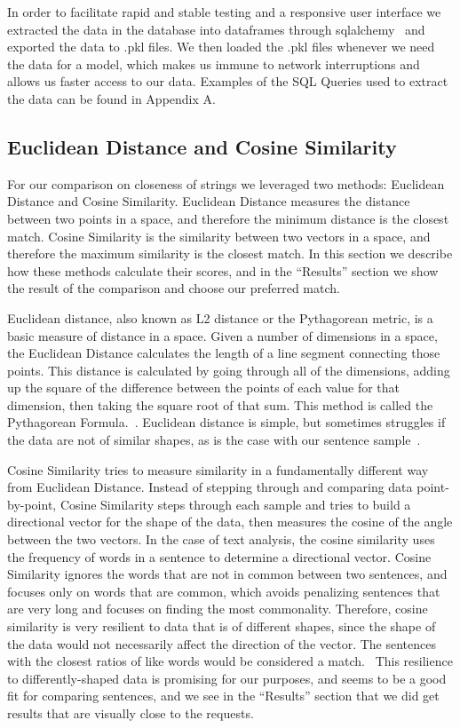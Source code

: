 \documentclass[runningheads]{llncs}
\begin{document}
	In order to facilitate rapid and stable testing and a responsive user interface we extracted the data in the database into dataframes through sqlalchemy~\cite{ref_url15} and exported the data to .pkl files. We then loaded the .pkl files whenever we need the data for a model, which makes us immune to network interruptions and allows us faster access to our data. Examples of the SQL Queries used to extract the data can be found in Appendix A.
	

	\subsection{Euclidean Distance and Cosine Similarity}	
	For our comparison on closeness of strings we leveraged two methods: Euclidean Distance and Cosine Similarity. Euclidean Distance measures the distance between two points in a space, and therefore the minimum distance is the closest match. Cosine Similarity is the similarity between two vectors in a space, and therefore the maximum similarity is the closest match. In this section we describe how these methods calculate their scores, and in the ``Results'' section we show the result of the comparison and choose our preferred match.
	
Euclidean distance, also known as L2 distance or the Pythagorean metric, is a basic measure of distance in a space. Given a number of dimensions in a space, the Euclidean Distance calculates the length of a line segment connecting those points. This distance is calculated by going through all of the dimensions, adding up the square of the difference between the points of each value for that dimension, then taking the square root of that sum. This method is called the Pythagorean Formula.~\cite{ref_url19}. Euclidean distance is simple, but sometimes struggles if the data are not of similar shapes, as is the case with our sentence sample~\cite{ref_url19}.

Cosine Similarity tries to measure similarity in a fundamentally different way from Euclidean Distance. Instead of stepping through and comparing data point-by-point, Cosine Similarity steps through each sample and tries to build a directional vector for the shape of the data, then measures the cosine of the angle between the two vectors. In the case of text analysis, the cosine similarity uses the frequency of words in a sentence to determine a directional vector. Cosine Similarity ignores the words that are not in common between two sentences, and focuses only on words that are common, which avoids penalizing sentences that are very long and focuses on finding the most commonality. Therefore, cosine similarity is very resilient to data that is of different shapes, since the shape of the data would not necessarily affect the direction of the vector. The sentences with the closest ratios of like words would be considered a match.~\cite{ref_book1} This resilience to differently-shaped data is promising for our purposes, and seems to be a good fit for comparing sentences, and we see in the ``Results'' section that we did get results that are visually close to the requests.
\end{document}
